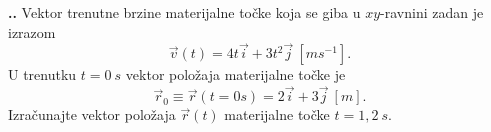 
\noindent 
\textbf{
\thecjelina.\thezadatak.}
Vektor trenutne brzine materijalne točke koja se giba u $xy$-ravnini zadan je izrazom
$$
\vec{v}(t)=4t\vec{i}+3t^2\vec{j}\ [ms^{-1}].
$$
U trenutku $t=0\ s$ vektor položaja materijalne točke je
$$
\vec{r}_0\equiv\vec{r}(t=0s)=2\vec{i}+3\vec{j}\ [m].
$$
Izračunajte vektor položaja $\vec{r}(t)$ materijalne točke $t=1,2\ s$.

